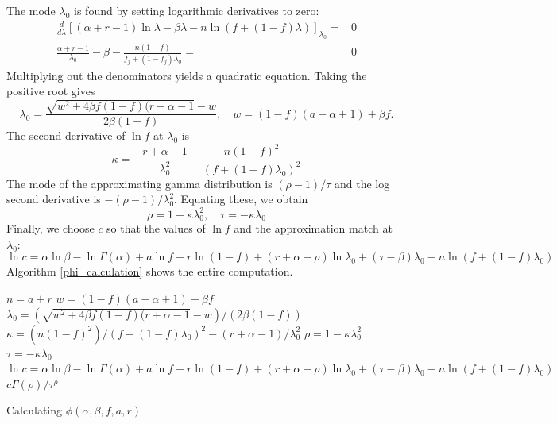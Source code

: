 \documentclass[nofootinbib,amssymb,amsmath]{revtex4}
\begin{document}
The mode $\lambda_0$ is found by setting logarithmic derivatives to zero:
%
\begin{align}
\frac{d}{d \lambda} \left[ (\alpha + r - 1) \ln \lambda - \beta \lambda - n \ln \left( f + (1-f) \lambda \right) \right]_{\lambda_0} =&  0 \\
\frac{\alpha + r - 1}{\lambda_0} - \beta - \frac{n (1-f)}{f_j + (1-f_j) \lambda_0} =& 0
\end{align}
%
Multiplying out the denominators yields a quadratic equation.  Taking the positive root gives
%
\begin{equation}
\lambda_0 = \frac{ \sqrt{w^2 + 4 \beta f (1-f)(r + \alpha - 1} - w}{2 \beta (1-f)}, \quad w = (1-f)(a - \alpha + 1) + \beta f.
\end{equation}
%
The second derivative of $\ln f$ at $\lambda_0$ is
%
\begin{equation}
\kappa = -\frac{r + \alpha - 1}{\lambda_0^2} + \frac{n(1-f)^2}{\left(f + (1-f)\lambda_0 \right)^2}
\end{equation}
%
The mode of the approximating gamma distribution is $(\rho - 1)/\tau$ and the log second derivative is $-(\rho - 1)/\lambda_0^2$.  Equating these, we obtain
\begin{equation}
\rho = 1 - \kappa \lambda_0^2, \quad \tau = -\kappa \lambda_0
\end{equation}
Finally, we choose $c$ so that the values of $\ln f$ and the approximation match at $\lambda_0$:
%
\begin{equation}
\ln c =  \alpha \ln \beta - \ln \Gamma(\alpha) + a \ln f + r \ln (1-f) +  (r + \alpha - \rho) \ln \lambda_0 + (\tau - \beta) \lambda_0 - n \ln \left( f + (1-f) \lambda_0 \right)
\end{equation}
%
Algorithm \ref{phi_calculation} shows the entire computation.

\begin{algorithm}
\begin{algorithmic}[1]
\State $n = a + r$
\State $w = (1-f)(a - \alpha + 1) + \beta f$
\State $\lambda_0 = \left( \sqrt{w^2 + 4 \beta f (1-f)(r + \alpha - 1} - w\right) / \left(2 \beta (1-f)\right)$
\State $\kappa = \left( n(1-f)^2 \right) / \left(f + (1-f)\lambda_0 \right)^2 - \left(r + \alpha - 1\right) / \lambda_0^2$
\State $\rho = 1 - \kappa \lambda_0^2$
\State $\tau = -\kappa \lambda_0$
\State $\ln c = \alpha \ln \beta - \ln \Gamma(\alpha) + a \ln f + r \ln (1-f) + (r + \alpha - \rho) \ln \lambda_0 + (\tau - \beta) \lambda_0 - n \ln \left( f + (1-f) \lambda_0 \right)$
\State \Return $c \Gamma(\rho) / \tau^\rho$
\end{algorithmic}
\caption{Calculating $\phi(\alpha, \beta, f, a, r)$}
\label{phi_calculation}
\end{algorithm}
\end{document}
